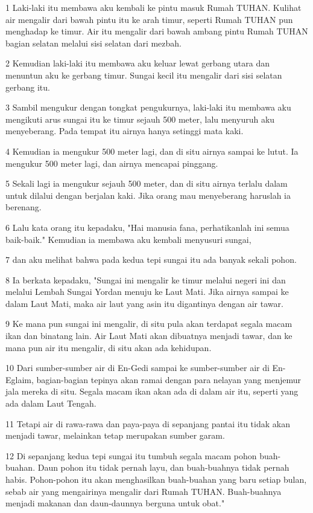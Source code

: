 \par 1 Laki-laki itu membawa aku kembali ke pintu masuk Rumah TUHAN. Kulihat air mengalir dari bawah pintu itu ke arah timur, seperti Rumah TUHAN pun menghadap ke timur. Air itu mengalir dari bawah ambang pintu Rumah TUHAN bagian selatan melalui sisi selatan dari mezbah.
\par 2 Kemudian laki-laki itu membawa aku keluar lewat gerbang utara dan menuntun aku ke gerbang timur. Sungai kecil itu mengalir dari sisi selatan gerbang itu.
\par 3 Sambil mengukur dengan tongkat pengukurnya, laki-laki itu membawa aku mengikuti arus sungai itu ke timur sejauh 500 meter, lalu menyuruh aku menyeberang. Pada tempat itu airnya hanya setinggi mata kaki.
\par 4 Kemudian ia mengukur 500 meter lagi, dan di situ airnya sampai ke lutut. Ia mengukur 500 meter lagi, dan airnya mencapai pinggang.
\par 5 Sekali lagi ia mengukur sejauh 500 meter, dan di situ airnya terlalu dalam untuk dilalui dengan berjalan kaki. Jika orang mau menyeberang haruslah ia berenang.
\par 6 Lalu kata orang itu kepadaku, "Hai manusia fana, perhatikanlah ini semua baik-baik." Kemudian ia membawa aku kembali menyusuri sungai,
\par 7 dan aku melihat bahwa pada kedua tepi sungai itu ada banyak sekali pohon.
\par 8 Ia berkata kepadaku, "Sungai ini mengalir ke timur melalui negeri ini dan melalui Lembah Sungai Yordan menuju ke Laut Mati. Jika airnya sampai ke dalam Laut Mati, maka air laut yang asin itu digantinya dengan air tawar.
\par 9 Ke mana pun sungai ini mengalir, di situ pula akan terdapat segala macam ikan dan binatang lain. Air Laut Mati akan dibuatnya menjadi tawar, dan ke mana pun air itu mengalir, di situ akan ada kehidupan.
\par 10 Dari sumber-sumber air di En-Gedi sampai ke sumber-sumber air di En-Eglaim, bagian-bagian tepinya akan ramai dengan para nelayan yang menjemur jala mereka di situ. Segala macam ikan akan ada di dalam air itu, seperti yang ada dalam Laut Tengah.
\par 11 Tetapi air di rawa-rawa dan paya-paya di sepanjang pantai itu tidak akan menjadi tawar, melainkan tetap merupakan sumber garam.
\par 12 Di sepanjang kedua tepi sungai itu tumbuh segala macam pohon buah-buahan. Daun pohon itu tidak pernah layu, dan buah-buahnya tidak pernah habis. Pohon-pohon itu akan menghasilkan buah-buahan yang baru setiap bulan, sebab air yang mengairinya mengalir dari Rumah TUHAN. Buah-buahnya menjadi makanan dan daun-daunnya berguna untuk obat."
